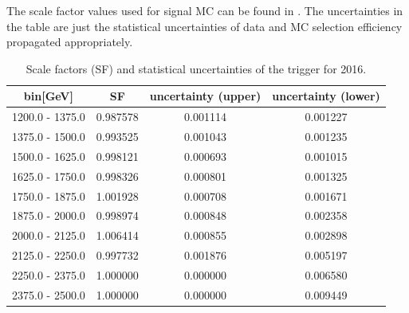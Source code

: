The scale factor values used for signal MC can be found in . The uncertainties in the table are just the statistical uncertainties of data and MC selection efficiency propagated appropriately.


\begin{table}
	\centering
	\caption{Scale factors (SF) and statistical uncertainties of the \HT trigger for 2016.}
	\label{tab:2016_triggerSF}
	\begin{tabular}{cccc}
		\hline
		\HT bin[GeV]    & SF       & uncertainty (upper) & uncertainty (lower) \\
		\hline
		1200.0 - 1375.0 & 0.987578 & 0.001114            & 0.001227            \\
		1375.0 - 1500.0 & 0.993525 & 0.001043            & 0.001235            \\
		1500.0 - 1625.0 & 0.998121 & 0.000693            & 0.001015            \\
		1625.0 - 1750.0 & 0.998326 & 0.000801            & 0.001325            \\
		1750.0 - 1875.0 & 1.001928 & 0.000708            & 0.001671            \\
		1875.0 - 2000.0 & 0.998974 & 0.000848            & 0.002358            \\
		2000.0 - 2125.0 & 1.006414 & 0.000855            & 0.002898            \\
		2125.0 - 2250.0 & 0.997732 & 0.001876            & 0.005197            \\
		2250.0 - 2375.0 & 1.000000 & 0.000000            & 0.006580            \\
		2375.0 - 2500.0 & 1.000000 & 0.000000            & 0.009449            \\
		\hline
	\end{tabular}
\end{table}

